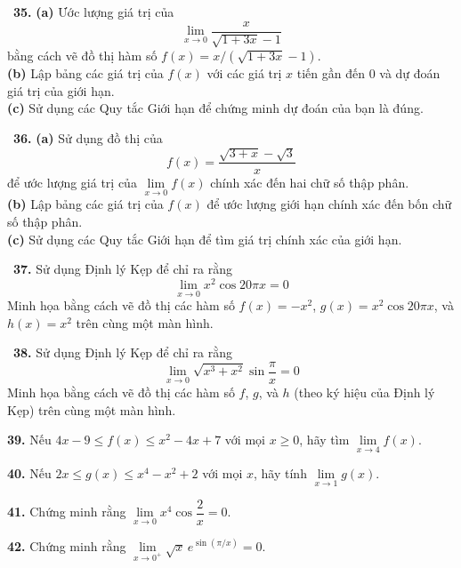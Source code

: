\begin{minipage}[t]{0.485\textwidth}
\vspace{8pt}
\noindent{\color{stewartcyan}\rule{\linewidth}{0.6pt}}
\vspace{6pt}

\graphcalcicon\ \textbf{35.} \textbf{(a)} Ước lượng giá trị của
\[
\lim_{x \to 0} \frac{x}{\sqrt{1 + 3x} - 1}
\]
bằng cách vẽ đồ thị hàm số $f(x) = x/(\sqrt{1 + 3x} - 1)$.\\
\textbf{(b)} Lập bảng các giá trị của $f(x)$ với các giá trị $x$ tiến gần đến $0$ và dự đoán giá trị của giới hạn.\\
\textbf{(c)} Sử dụng các Quy tắc Giới hạn để chứng minh dự đoán của bạn là đúng.
\end{minipage}%
\hfill
\begin{minipage}[t]{0.485\textwidth}
\graphcalcicon\ \textbf{36.} \textbf{(a)} Sử dụng đồ thị của
\[
f(x) = \frac{\sqrt{3 + x} - \sqrt{3}}{x}
\]
để ước lượng giá trị của $\lim\limits_{x \to 0} f(x)$ chính xác đến hai chữ số thập phân.\\
\textbf{(b)} Lập bảng các giá trị của $f(x)$ để ước lượng giới hạn chính xác đến bốn chữ số thập phân.\\
\textbf{(c)} Sử dụng các Quy tắc Giới hạn để tìm giá trị chính xác của giới hạn.

\vspace{6pt}
\graphcalcicon\ \textbf{37.} Sử dụng Định lý Kẹp để chỉ ra rằng
\[
\lim_{x \to 0} x^2 \cos 20\pi x = 0
\]
Minh họa bằng cách vẽ đồ thị các hàm số $f(x) = -x^2$, $g(x) = x^2 \cos 20\pi x$, và $h(x) = x^2$ trên cùng một màn hình.

\vspace{6pt}
\graphcalcicon\ \textbf{38.} Sử dụng Định lý Kẹp để chỉ ra rằng
\[
\lim_{x \to 0} \sqrt{x^3 + x^2} \sin \frac{\pi}{x} = 0
\]
Minh họa bằng cách vẽ đồ thị các hàm số $f$, $g$, và $h$ (theo ký hiệu của Định lý Kẹp) trên cùng một màn hình.

\vspace{6pt}
\textbf{39.} Nếu $4x - 9 \le f(x) \le x^2 - 4x + 7$ với mọi $x \ge 0$, hãy tìm $\lim\limits_{x \to 4} f(x)$.

\vspace{6pt}
\textbf{40.} Nếu $2x \le g(x) \le x^4 - x^2 + 2$ với mọi $x$, hãy tính $\lim\limits_{x \to 1} g(x)$.

\vspace{6pt}
\textbf{41.} Chứng minh rằng $\lim\limits_{x \to 0} x^4 \cos \dfrac{2}{x} = 0$.

\vspace{6pt}
\textbf{42.} Chứng minh rằng $\lim\limits_{x \to 0^+} \sqrt{x}\, e^{\sin(\pi/x)} = 0$.


\end{minipage}
